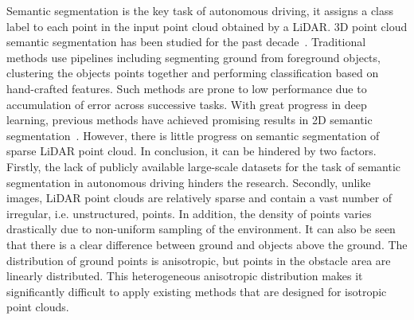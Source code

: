 \documentclass{sip}%
\begin{document}
Semantic segmentation is the key task of autonomous driving, it
assigns a class label to each point in the input point cloud obtained by a LiDAR.
%
3D point cloud semantic segmentation has been studied for the past decade~\cite{tchapmi2017segcloud,boulch2017unstructured,riegler2017octnet,qi2017pointnet,qi2017pointnet++,landrieu2018large,jiang2018pointsift,li2018pointcnn}. 
Traditional methods use pipelines including segmenting ground from foreground objects, clustering the objects points together and performing classification based on hand-crafted features. 
Such methods are prone to low performance due to accumulation of error across successive tasks. 
With great progress in deep learning, previous methods have achieved promising results in 2D semantic segmentation~\cite{long2015fully,chen2018deeplab,kirillov2018panoptic,chen2014semantic}. 
However, there is little progress on semantic segmentation of sparse LiDAR point cloud. 
In conclusion, it can be hindered by two factors. 
Firstly, the lack of publicly available
large-scale datasets for the task of semantic segmentation in autonomous driving hinders the research. 
Secondly, unlike images, LiDAR point clouds are relatively sparse and contain a vast number of irregular, i.e. unstructured, points. 
In addition, the density of points varies
drastically due to non-uniform sampling of the environment. It can also be seen that there is a clear difference between ground and objects above the ground.
The distribution of ground points is anisotropic, but points in the obstacle area are linearly distributed.
This heterogeneous anisotropic distribution makes it significantly difficult to apply existing methods that are designed for isotropic point clouds.
\end{document}
